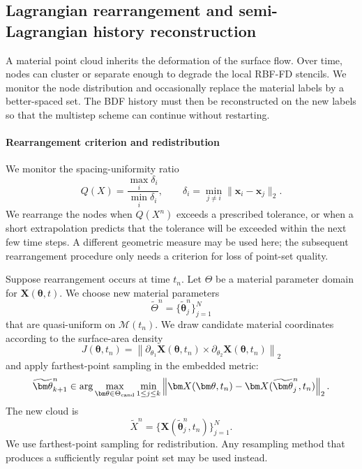 \documentclass[a4paper,fleqn]{cas-sc}
\begin{document}
\subsection{Lagrangian rearrangement and semi-Lagrangian history reconstruction}
\label{subsec:lagrangian-rearrangement-history}

A material point cloud inherits the deformation of the surface flow.  Over
time, nodes can cluster or separate enough to degrade the local RBF-FD
stencils.  We monitor the node distribution and occasionally replace the material labels
by a better-spaced set.  The BDF history must then be reconstructed on the new
labels so that the multistep scheme can continue without restarting.

\paragraph{Rearrangement criterion and redistribution}
We monitor the spacing-uniformity ratio
\begin{equation}
  Q(X)
  =
  \frac{\max_i\delta_i}{\min_i\delta_i},
  \qquad
  \delta_i=\min_{j\neq i}\|\bm x_i-\bm x_j\|_2.
  \label{eq:spacing-uniformity}
\end{equation}
We rearrange the nodes when $Q(X^n)$ exceeds a prescribed tolerance, or when a
short extrapolation predicts that the tolerance will be exceeded within the
next few time steps.  A different geometric measure may be used here; the subsequent rearrangement
procedure only needs a criterion for loss of point-set quality.

Suppose rearrangement occurs at time $t_n$.  Let $\Theta$ be a material parameter
domain for $\bm X(\bm\theta,t)$.  We choose new material parameters
\[
  \widetilde\Theta^n
  =\{\widetilde{\bm\theta}_j^n\}_{j=1}^N
\]
that are quasi-uniform on $\mathcal M(t_n)$.  We draw candidate material coordinates according to the surface-area density
\begin{equation}
  J(\bm\theta,t_n)
  =
  \left\|
    \partial_{\theta_1}\bm X(\bm\theta,t_n)
    \times
    \partial_{\theta_2}\bm X(\bm\theta,t_n)
  \right\|_2
  \label{eq:surface-area-density}
\end{equation}
and apply farthest-point sampling in the embedded metric:
\begin{equation}
  \widetilde{\bm\theta}_{k+1}^n
  \in
  \arg\max_{\bm\theta\in\Theta_{\rm cand}}
  \min_{1\leq j\leq k}
  \left\|
    \bm X(\bm\theta,t_n)
    -\bm X(\widetilde{\bm\theta}_j^n,t_n)
  \right\|_2.
  \label{eq:fps-remap}
\end{equation}
The new cloud is
\[
  \widetilde X^n
  =
  \{\bm X(\widetilde{\bm\theta}_j^n,t_n)\}_{j=1}^N.
\]
We use farthest-point sampling for redistribution.  Any resampling method that
produces a sufficiently regular point set may be used instead.
\end{document}
